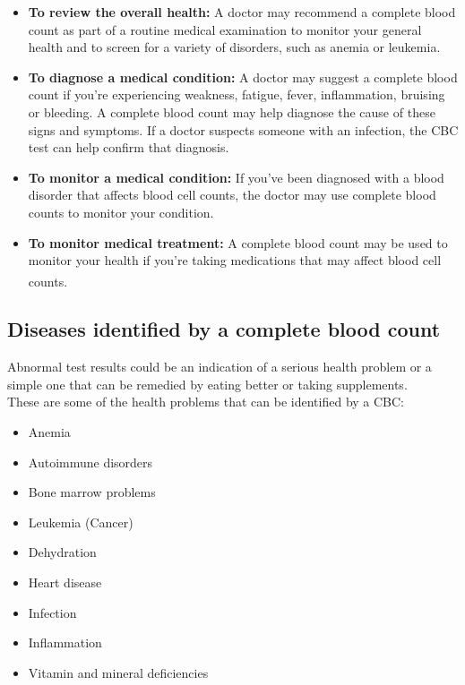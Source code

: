 \begin{itemize}
  \item \textbf{To review the overall health:} A doctor may recommend a complete blood count as part of a routine medical examination to monitor your general health and to screen for a variety of disorders, such as anemia or leukemia.
  \item \textbf{To diagnose a medical condition:} A doctor may suggest a complete blood count if you're experiencing weakness, fatigue, fever, inflammation, bruising or bleeding. A complete blood count may help diagnose the cause of these signs and symptoms. If a doctor suspects someone with an infection, the CBC test can help confirm that diagnosis.
  \item \textbf{To monitor a medical condition:} If you've been diagnosed with a blood disorder that affects blood cell counts, the doctor may use complete blood counts to monitor your condition.
  \item \textbf{To monitor medical treatment:} A complete blood count may be used to monitor your health if you're taking medications that may affect blood cell counts. \textsuperscript{\cite{CBC-mayoclinic}}
\end{itemize}

\subsection{Diseases identified by a complete blood count}

Abnormal test results could be an indication of a serious health problem or a simple one that can be remedied by eating better or taking supplements.\\
These are some of the health problems that can be identified by a CBC:

\begin{itemize}
  \item Anemia
  \item Autoimmune disorders
  \item Bone marrow problems
  \item Leukemia (Cancer)
  \item Dehydration
  \item Heart disease
  \item Infection
  \item Inflammation
  \item Vitamin and mineral deficiencies
\end{itemize}
